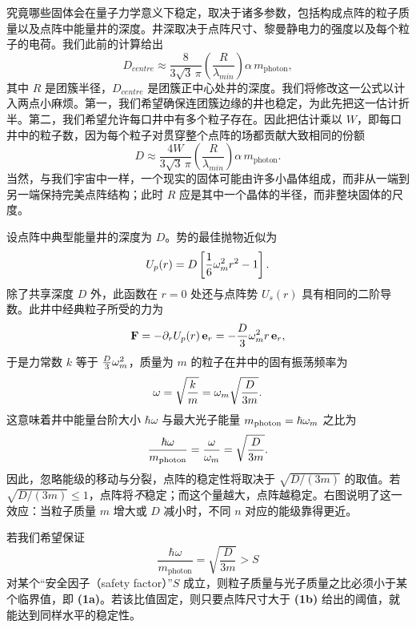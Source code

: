 究竟哪些固体会在量子力学意义下稳定，取决于诸多参数，包括构成点阵的粒子质量以及点阵中能量井的深度。井深取决于点阵尺寸、黎曼静电力的强度以及每个粒子的电荷。我们此前的计算给出
\begin{equation}
D_{centre}\approx \frac{8}{3\sqrt{3}\,\pi}\left(\frac{R}{\lambda_{min}}\right)\alpha\,m_{\mathrm{photon}},
\end{equation}
其中 $R$ 是团簇半径，$D_{centre}$ 是团簇正中心处井的深度。我们将修改这一公式以计入两点小麻烦。第一，我们希望确保连团簇边缘的井也稳定，为此先把这一估计折半。第二，我们希望允许每口井中有多个粒子存在。因此把估计乘以 $W$，即每口井中的粒子数，因为每个粒子对贯穿整个点阵的场都贡献大致相同的份额
\begin{equation}
D\approx \frac{4W}{3\sqrt{3}\,\pi}\left(\frac{R}{\lambda_{min}}\right)\alpha\,m_{\mathrm{photon}} .
\end{equation}
当然，与我们宇宙中一样，一个现实的固体可能由许多小晶体组成，而非从一端到另一端保持完美点阵结构；此时 $R$ 应是其中一个晶体的半径，而非整块固体的尺度。

设点阵中典型能量井的深度为 $D$。势的最佳抛物近似为
\begin{equation}
U_{p}(r)=D\left[\frac{1}{6}\omega_m^{2}r^{2}-1\right].
\end{equation}
除了共享深度 $D$ 外，此函数在 $r=0$ 处还与点阵势 $U_{s}(r)$ 具有相同的二阶导数。此井中经典粒子所受的力为
\begin{equation}
\mathbf{F}=-\partial_{r}U_{p}(r)\,\mathbf{e}_{r}=-\frac{D}{3}\omega_m^{2}r\,\mathbf{e}_{r},
\end{equation}
于是力常数 $k$ 等于 $\tfrac{D}{3}\omega_m^{2}$，质量为 $m$ 的粒子在井中的固有振荡频率为
\begin{equation}
\omega=\sqrt{\frac{k}{m}}=\omega_m\sqrt{\frac{D}{3m}} .
\end{equation}
这意味着井中能量台阶大小 $\hbar\omega$ 与最大光子能量 $m_{\mathrm{photon}}=\hbar\omega_m$ 之比为
\begin{equation}
\frac{\hbar\omega}{m_{\mathrm{photon}}}=\frac{\omega}{\omega_m}=\sqrt{\frac{D}{3m}} .
\end{equation}
因此，忽略能级的移动与分裂，点阵的稳定性将取决于 $\sqrt{D/(3m)}$ 的取值。若 $\sqrt{D/(3m)}\le 1$，点阵将\emph{不}稳定；而这个量越大，点阵越稳定。右图说明了这一效应：当粒子质量 $m$ 增大或 $D$ 减小时，不同 $n$ 对应的能级靠得更近。

若我们希望保证
\begin{equation}
\frac{\hbar\omega}{m_{\mathrm{photon}}}=\sqrt{\frac{D}{3m}}>S
\end{equation}
对某个“安全因子（safety factor）”$S$ 成立，则粒子质量与光子质量之比必须小于某个临界值，即 \textbf{(1a)}。若该比值固定，则只要点阵尺寸大于 \textbf{(1b)} 给出的阈值，就能达到同样水平的稳定性。

